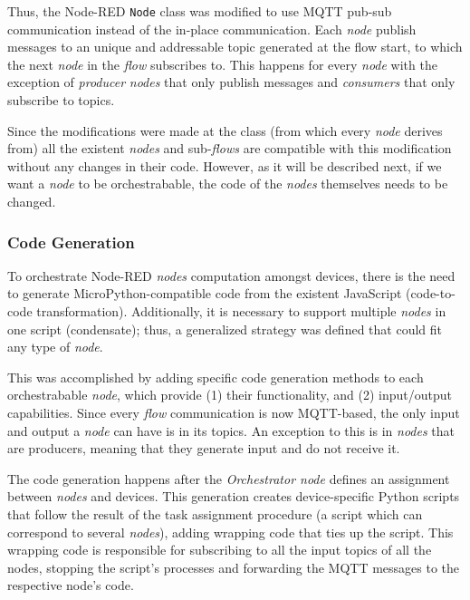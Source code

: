 Thus, the Node-RED \texttt{Node} class was modified to use MQTT pub-sub communication instead of the in-place communication. Each \textit{node} publish messages to an unique and addressable topic generated at the flow start, to which the next \textit{node} in the \textit{flow} subscribes to. This happens for every \textit{node} with the exception of \textit{producer} \textit{nodes} that only publish messages and \textit{consumers} that only subscribe to topics.

Since the modifications were made at the class (from which every \textit{node} derives from) all the existent \textit{nodes} and sub-\textit{flows} are compatible with this modification without any changes in their code. However, as it will be described next, if we want a \textit{node} to be orchestrabable, the code of the \textit{nodes} themselves needs to be changed.

\subsubsection{Code Generation}\label{sec:code_generation}

To orchestrate Node-RED \textit{nodes} computation amongst devices, there is the need to generate MicroPython-compatible code from the existent JavaScript (\ie code-to-code transformation). Additionally, it is necessary to support multiple \textit{nodes} in one script (\ie condensate); thus, a generalized strategy was defined that could fit any type of \textit{node}.

This was accomplished by adding specific code generation methods to each orchestrabable \textit{node}, which provide (1) their functionality, and (2) input/output capabilities. Since every \textit{flow} communication is now MQTT-based, the only input and output a \textit{node} can have is in its topics. An exception to this is in \textit{nodes} that are producers, meaning that they generate input and do not receive it. 

The code generation happens after the \textit{Orchestrator node} defines an assignment between \textit{nodes} and devices. This generation creates device-specific Python scripts that follow the result of the task assignment procedure (a script which can correspond to several \textit{nodes}), adding wrapping code that ties up the script. This wrapping code is responsible for subscribing to all the input topics of all the nodes, stopping the script's processes and forwarding the MQTT messages to the respective node's code.

